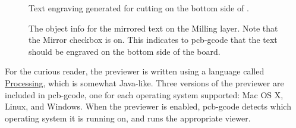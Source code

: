 \documentclass[11pt]{book}
\begin{document}
\begin{figure}
	\caption{Text engraving generated for cutting on the bottom side of .}
	\label{fig:BottomText}
\end{figure}

\clearpage

\begin{figure}
	\caption{The object info for the mirrored text on the Milling layer. Note that the Mirror checkbox is on. This indicates to pcb-gcode that the text should be engraved on the bottom side of the board.}
	\label{fig:MirroredTextInfo}
\end{figure}


\howitworks{}
For the curious reader, the previewer is written using a language called \href{http://processing.org}{Processing}, which is somewhat Java-like. Three versions of the previewer are included in pcb-gcode, one for each operating system supported: Mac OS X, Linux, and Windows. When the previewer is enabled, pcb-gcode detects which operating system it is running on, and runs the appropriate viewer.
\end{document}
